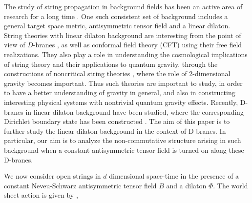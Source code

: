 \documentclass[a4paper,12pt]{article}
\begin{document}
\newpage

The study of string propagation in background fields has been an active
area of research for a long time \cite{friedan}. One such consistent 
set of background includes a general target space metric, antisymmetric 
tensor field and a linear dilaton. String theories with linear dilaton 
background \cite{myers} are interesting from the point of view of 
$D$-branes \cite{li,rajaraman}, as well as conformal 
field theory (CFT) using their free field realizations. 
They also play a role in understanding the cosmological implications  
of string theory\cite{bachas} and their applications to 
quantum gravity, through the constructions of 
noncritical string theories \cite{sasha,marn,david,DK,nati}, 
where the role of 2-dimensional gravity  becomes important. 
Thus such theories are important to study, in order to have a better
understanding of gravity in general, and also in constructing interesting 
physical systems with nontrivial 
quantum gravity effects. Recently, D-branes in linear dilaton background
have been studied, where the corresponding Dirichlet boundary state 
has been constructed \cite{li,rajaraman}. 
The aim of this paper is to further study the linear 
dilaton background in the context of D-branes. In particular, our aim 
is to analyze the non-commutative structure \cite{SW} 
arising in such background when a constant antisymmetric tensor field
is turned on along these D-branes.

We now consider open strings in $d$ dimensional space-time in the 
presence of a constant Neveu-Schwarz antisymmetric tensor field
$B$ and a dilaton $\Phi$. The world sheet action is given by 
\cite{callan},
\end{document}
